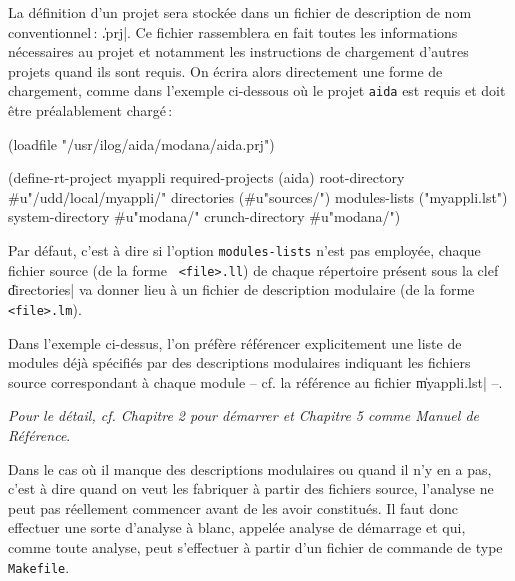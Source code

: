 La d\'{e}finition d'un projet sera stock\'{e}e dans un fichier de
description de nom conventionnel\,: \|<nom de projet>.prj|. 
Ce fichier rassemblera en fait toutes les informations n\'{e}cessaires
au projet et notamment les instructions de chargement 
d'autres projets quand ils sont requis.
On \'{e}crira alors directement une forme de chargement,
comme dans l'exemple ci-dessous o\`{u} le projet {\tt aida} est requis
et doit \^{e}tre pr\'{e}alablement charg\'{e}\,:
\begin{Code*}
(loadfile "/usr/ilog/aida/modana/aida.prj")

(define-rt-project myappli
   required-projects (aida)
   root-directory #u"/udd/local/myappli/" 
   directories (#u"sources/")
   modules-lists ("myappli.lst")
   system-directory #u"modana/"
   crunch-directory #u"modana/")
\end{Code*}


Par d\'{e}faut, c'est \`{a} dire si l'option {\tt modules-lists}
n'est pas employ\'{e}e, chaque fichier source (de la forme {\tt
<file>.ll}) de chaque r\'{e}pertoire pr\'{e}sent sous la clef \|directories|
va donner lieu \`{a} un fichier de description modulaire
(de la forme {\tt <file>.lm}).

Dans l'exemple ci-dessus, l'on pr\'{e}f\`{e}re r\'{e}f\'{e}rencer 
explicitement une liste de modules d\'{e}j\`{a} sp\'{e}cifi\'{e}s par
des descriptions modulaires indiquant les fichiers source
correspondant \`{a} chaque module -- cf. la r\'{e}f\'{e}rence au
fichier \|myappli.lst| --.

\medskip 

{\em Pour le d\'{e}tail, cf. Chapitre 2 pour d\'{e}marrer et Chapitre 5
comme Manuel de R\'{e}f\'{e}rence}.



Dans le cas o\`{u} il manque des descriptions modulaires ou quand il 
n'y en a pas, c'est \`{a} dire quand on veut les fabriquer \`{a} partir
des fichiers source, l'analyse ne peut pas r\'{e}ellement commencer
avant de les avoir constitu\'{e}s.
Il faut donc effectuer une sorte d'analyse \`{a} blanc, appel\'{e}e
analyse de d\'{e}marrage et qui, comme toute analyse, peut
s'effectuer \`{a} partir d'un fichier de commande de type
{\tt Makefile}.



